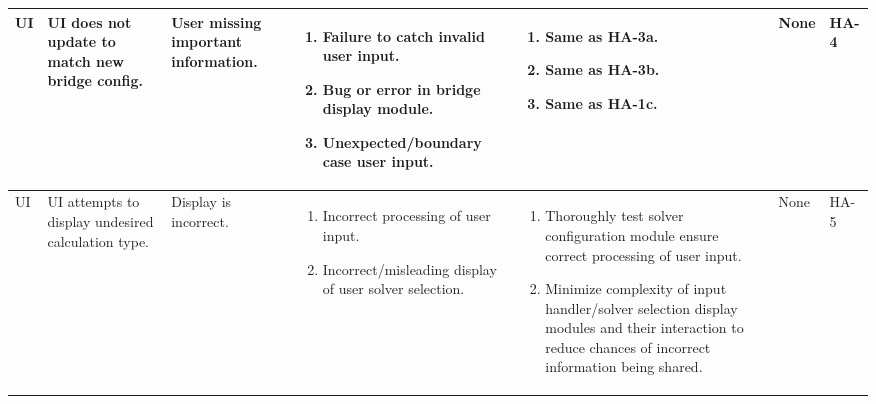 \documentclass{article}
\begin{document}
\begin{landscape}
\begin{longtable}{|p{} | p{} | p{} | p{} | p{} | p{} | p{}|}
  UI & UI does not update to match new bridge config. & User missing important information. &
  \begin{enumerate}[leftmargin=*, label={\alph*.}, itemsep=1pt, topsep=0pt, partopsep=0pt] 
    \item Failure to catch invalid user input.
    \item Bug or error in bridge display module.
    \item Unexpected/boundary case user input.
  \end{enumerate} &
  \begin{enumerate}[leftmargin=*, label={\alph*.}, itemsep=1pt, topsep=0pt, partopsep=0pt] 
    \item Same as HA-3a.
    \item  Same as HA-3b.
    \item Same as HA-1c.
  \end{enumerate} &
  None & HA-4 \\

  \hline

  UI & UI attempts to display undesired calculation type. & Display is incorrect. & 
  \begin{enumerate}[leftmargin=*, label={\alph*.}, itemsep=1pt, topsep=0pt, partopsep=0pt] 
    \item Incorrect processing of user input.
    \item Incorrect/misleading display of user solver selection.
  \end{enumerate} &
  \begin{enumerate}[leftmargin=*, label={\alph*.}, itemsep=1pt, topsep=0pt, partopsep=0pt] 
    \item Thoroughly test solver configuration module ensure correct processing of user input.
    \item Minimize complexity of input handler/solver selection display modules and their interaction to 
    reduce chances of incorrect information being shared.
  \end{enumerate} &
  None & HA-5 \\

  \hline


\end{longtable}
\end{landscape}
\end{document}
